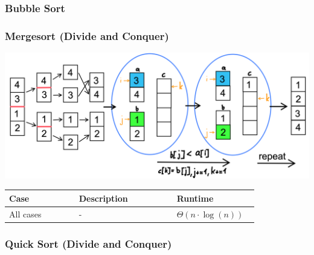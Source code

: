     \subsubsection{Bubble Sort}
        
    \subsubsection{Mergesort (Divide and Conquer)}
        \includegraphics[width = \linewidth]{src/6_algorithms/images/mergesort.png}
          

        

        \begin{tabular*}{\linewidth}{| p{0.25\linewidth} | p{0.35\linewidth} | p{0.22\linewidth} |}
            \hline
            Case & Description & Runtime\\
            \hline \hline
            All cases & - & $\Theta (n \cdot \log(n))$ \\
            \hline
        \end{tabular*}
    
    \subsubsection{Quick Sort (Divide and Conquer)}
        